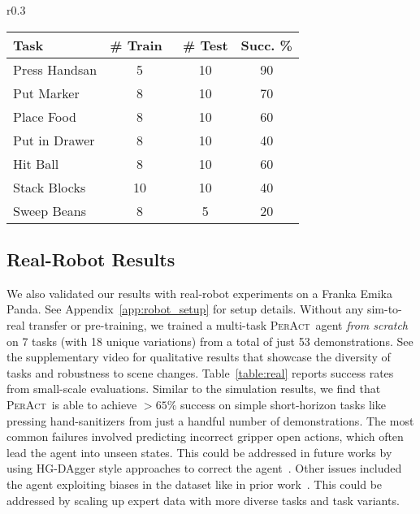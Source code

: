 \documentclass{article}
\newcommand{\appsecref}[1]{Appendix~\ref{#1}}
\newcommand{\figref}[1]{Figure~\ref{#1}}
\newcommand{\tabref}[1]{Table~\ref{#1}}
\newcommand{\model}{\textsc{PerAct}}
\begin{document}
\begin{wraptable}{r}{0.3\textwidth}
  \vspace{-1.3em}
  \setlength\tabcolsep{2.3pt}
  \centering
  \scriptsize
\begin{tabular}{lccc} 
\toprule
Task          & \# Train~ & \# Test & Succ. \%  \\ 
\midrule
Press Handsan & 5         & 10      & 90        \\
Put Marker    & 8         & 10      & 70        \\
Place Food    & 8         & 10      & 60        \\
Put in Drawer & 8         & 10      & 40        \\
Hit Ball      & 8         & 10      & 60        \\
Stack Blocks  & 10        & 10      & 40        \\
Sweep Beans   & 8         & 5       & 20        \\
\bottomrule
\end{tabular}
    \caption{\scriptsize{Success rates (mean \%) of a multi-task model trained an evaluated 7 real-world tasks (see \figref{fig:tasks}).}} \vspace{-2em}
  \label{table:real}
\end{wraptable} \subsection{Real-Robot Results} \label{sec:real_robot_results}
We also validated our results with real-robot experiments on a Franka Emika Panda. See  \appsecref{app:robot_setup} for setup details. Without any sim-to-real transfer or pre-training, we trained a multi-task \model~agent \textit{from scratch }on 7 tasks (with 18 unique variations) from a total of just 53 demonstrations. See the supplementary video for qualitative results that showcase the diversity of tasks and robustness to scene changes. \tabref{table:real} reports success rates from small-scale evaluations. Similar to the simulation results, we find that \model~is able to achieve $>65\%$ success on simple short-horizon tasks like pressing hand-sanitizers from just a handful number of demonstrations. The most common failures involved predicting incorrect gripper open actions, which often lead the agent into unseen states. This could be addressed in future works by using HG-DAgger style approaches to correct the agent~\citep{jang2022bc}. Other issues included the agent exploiting biases in the dataset like in prior work~\citep{cliport}. This could be addressed by scaling up expert data with more diverse tasks and task variants.  
\end{document}
